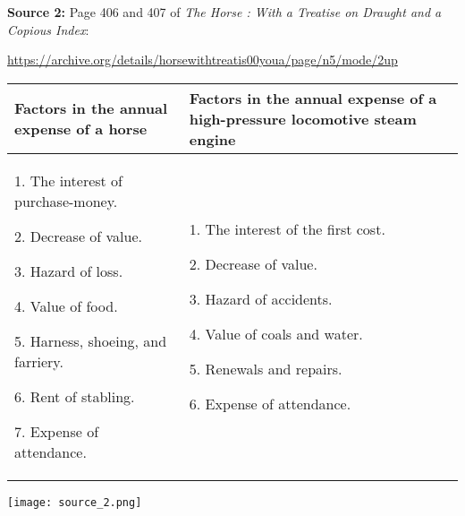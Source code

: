 \textbf{Source 2:} Page 406 and 407 of \emph{The Horse : With a Treatise on Draught and a Copious Index}: \cite{youat31}

\url{https://archive.org/details/horsewithtreatis00youa/page/n5/mode/2up} \\

{\renewcommand{\arraystretch}{2}
\begin{tabular}{| p{8cm} | p{8cm} |}
    \hline
     \textbf{Factors in the annual expense of a horse} & 
     \textbf{Factors in the annual expense of a high-pressure locomotive steam engine} \\
     \hline\hline
     
    1. The interest of purchase-money.
    
    2. Decrease of value.
    
    3. Hazard of loss.
    
    4. Value of food.
    
    5. Harness, shoeing, and farriery.
    
    6. Rent of stabling.
    
    7. Expense of attendance. &
    
    1. The interest of the first cost. 
    
    2. Decrease of value.
    
    3. Hazard of accidents.
    
    4. Value of coals and water.
    
    5. Renewals and repairs.
    
    6. Expense of attendance. \\\hline
     
\end{tabular}}

\texttt{[image: source\_2.png]} \\